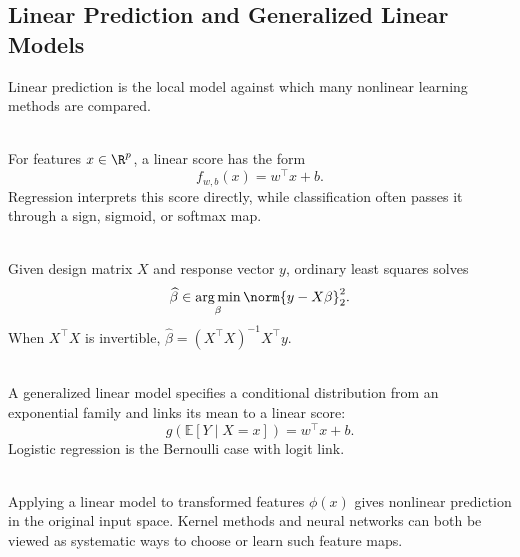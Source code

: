 \subsection{Linear Prediction and Generalized Linear Models}

Linear prediction is the local model against which many nonlinear learning methods are compared.

\begin{definition} \label{def:sl-linear-predictor} \\
For features $x\in\R^p$, a linear score has the form
\[
f_{w,b}(x)=w^\top x+b.
\]
Regression interprets this score directly, while classification often passes it through a sign, sigmoid, or softmax map.
\end{definition}

\begin{example} \label{ex:sl-linear-regression-risk} \\
Given design matrix $X$ and response vector $y$, ordinary least squares solves
\[
\widehat{\beta}\in\operatorname*{arg\,min}_{\beta}\norm{y-X\beta}_2^2.
\]
When $X^\top X$ is invertible, $\widehat{\beta}=(X^\top X)^{-1}X^\top y$.
\end{example}

\begin{definition} \label{def:sl-generalized-linear-model} \\
A generalized linear model specifies a conditional distribution from an exponential family and links its mean to a linear score:
\[
g(\mathbb{E}[Y\mid X=x])=w^\top x+b.
\]
Logistic regression is the Bernoulli case with logit link.
\end{definition}

\begin{remark} \label{rem:sl-feature-maps-linear-models} \\
Applying a linear model to transformed features $\phi(x)$ gives nonlinear prediction in the original input space.  Kernel methods and neural networks can both be viewed as systematic ways to choose or learn such feature maps.
\end{remark}

